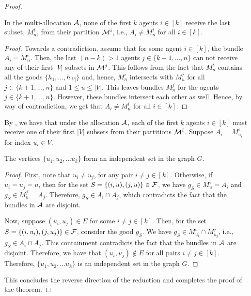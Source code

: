 \begin{proof}
\begin{claim}
\label{claim:notlastbundle}
In the multi-allocation $\mathcal{A}$, none of the first $k$ agents $i \in [k]$ receive the last subset, $M^i_n$, from their partition $\mathcal{M}^i$, i.e., $A_i \neq M^i_n$ for all $i \in [k]$. 
\end{claim}
\begin{proof}
Towards a contradiction, assume that for some agent $i \in [k]$, the bundle $A_i = M^i_n$. Then, the last $(n-k) > 1$ agents $j \in \{k+1,\ldots, n\}$ can not receive  any of their first $|V|$ subsets in $\mathcal{M}^j$. This follows from the fact that $M^i_n$ contains all the goods $\{h_1, \ldots, h_{|V|} \}$ and, hence, $M^i_n$ intersects with $M^j_u$ for all $j \in \{k+1,\ldots, n\}$ and $1 \leq u \leq |V|$. This leaves bundles $M^j_n$ for the agents $j \in \{k+1,\ldots, n\}$. However, these bundles intersect each other as well. Hence, by way of contradiction, we get that $A_i \neq M^i_n$ for all $i \in [k]$. 
\end{proof}

By , we have that under the allocation $\mathcal{A}$, each of the first $k$ agents $i \in [k]$ must receive one of their first $|V|$ subsets from their partitions $\mathcal{M}^i$. Suppose $A_i = M^i_{u_i}$ for index $u_i \in V$.  
\begin{claim}\label{claim:indset}
The vertices $\{u_1, u_2, \ldots u_k\}$ form an independent set in the graph $G$.
\end{claim}
\begin{proof} First, note that $u_i \neq u_j$, for any pair $i \neq j \in [k]$. Otherwise, if $u_i = u_j = u$, then for the set $S = \{ (i, u), (j, u)\} \in \mathcal{F}$, we have $g_S \in M^i_u = A_i$ and $g_S \in M^j_u = A_j$. Therefore, $g_S \in A_i \cap A_j$, which contradicts the fact that the bundles in $\mathcal{A}$ are disjoint.
        
 Now, suppose $(u_i, u_j) \in E$ for some $i \neq j \in [k]$. Then, for the set $S = \{(i, u_i), (j, u_j)\} \in \mathcal{F}$, consider the good $g_S$. We have $g_S \in M^i_{u_i} \cap M^j_{u_j}$, i.e., $g_S \in A_i \cap A_j$. This containment contradicts the fact that the bundles in $\mathcal{A}$ are disjoint. Therefore, we have that $(u_i, u_j) \notin E$ for all pairs $i \neq j \in [k]$. Therefore, $\{u_1, u_2, \ldots u_k\}$ is an independent set in the graph $G$.  
\end{proof}
This concludes the reverse direction of the reduction and completes the proof of the theorem.
\end{proof}